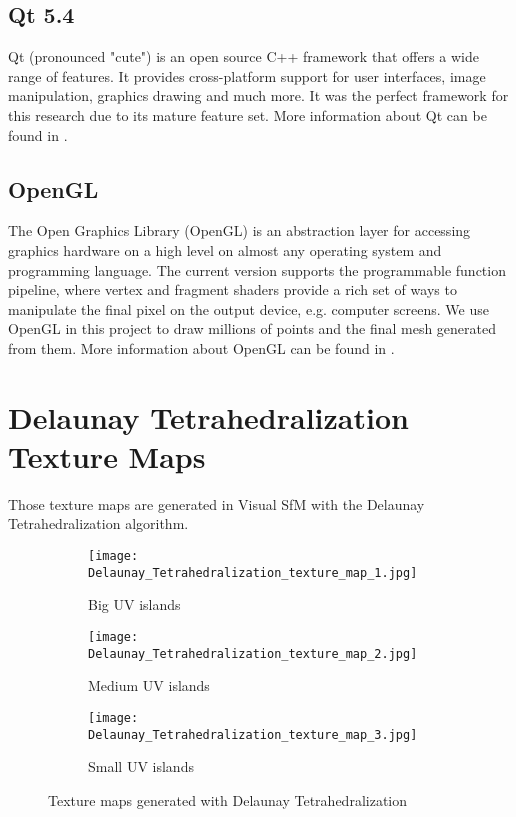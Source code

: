 \subsection{Qt 5.4}

Qt (pronounced "cute") is an open source C++ framework that offers a wide range of features. It provides cross-platform support for user interfaces, image manipulation, graphics drawing and much more. It was the perfect framework for this research due to its mature feature set. More information about Qt can be found in \parencite{appendix_qt}.

\subsection{OpenGL}

The Open Graphics Library (OpenGL) is an abstraction layer for accessing graphics hardware on a high level on almost any operating system and programming language. The current version supports the programmable function pipeline, where vertex and fragment shaders provide a rich set of ways to manipulate the final pixel on the output device, e.g. computer screens. We use OpenGL in this project to draw millions of points and the final mesh generated from them. More information about OpenGL can be found in \parencite{appendix_opengl}.

\section{Delaunay Tetrahedralization Texture Maps}
\label{appendix_delaunay_texture_maps}

Those texture maps are generated in Visual SfM with the Delaunay Tetrahedralization algorithm.

\begin{figure}[h]
	\centering
	\begin{subfigure}[b]{0.3\textwidth}
		\centering
		\texttt{[image: Delaunay\_Tetrahedralization\_texture\_map\_1.jpg]}
		\caption{Big UV islands}
		\label{fig:appendix_dt_1}
	\end{subfigure}
	\hfill
	\begin{subfigure}[b]{0.3\textwidth}
		\centering
		\texttt{[image: Delaunay\_Tetrahedralization\_texture\_map\_2.jpg]}
		\caption{Medium UV islands}
		\label{fig:appendix_dt_2}
	\end{subfigure}
	\hfill
	\begin{subfigure}[b]{0.3\textwidth}
		\centering
		\texttt{[image: Delaunay\_Tetrahedralization\_texture\_map\_3.jpg]}
		\caption{Small UV islands}
		\label{fig:appendix_dt_3}
	\end{subfigure}
	\caption{Texture maps generated with Delaunay Tetrahedralization}
	\label{fig:appendix_dt}
\end{figure}
